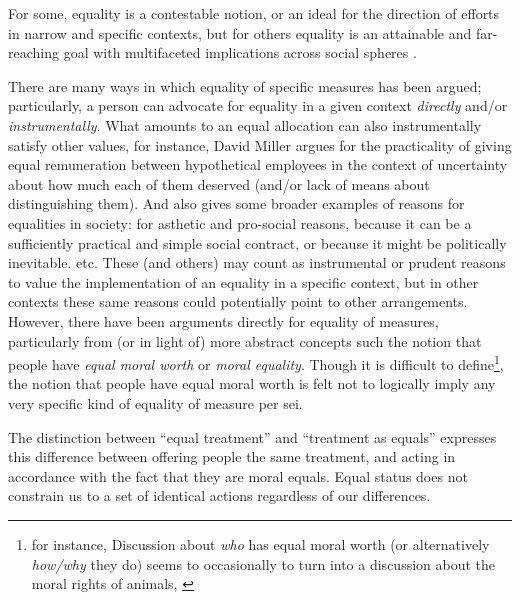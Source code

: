 For some, equality is a contestable notion, or an ideal for the direction of efforts in narrow and specific contexts, but for others equality is an attainable and far-reaching goal with multifaceted implications across social spheres \cite{walzer2008spheres,millerandwalzer,baker1992arguing}.

There are many ways in which equality of specific measures has been argued; particularly, a person can advocate for equality in a given context \textit{directly} and/or \textit{instrumentally}.
What amounts to an equal allocation can also instrumentally satisfy other values, for instance, David Miller \cite{equalityandjustice:1998} argues for the practicality of giving equal remuneration between hypothetical employees in the context of uncertainty about how much each of them deserved (and/or lack of means about distinguishing them). And also gives some broader examples of reasons for equalities in society: for asthetic and pro-social reasons, because it can be a sufficiently practical and simple social contract, or because it might be politically inevitable. etc.
These (and others) may count as instrumental or prudent reasons to value the implementation of an equality in a specific context, but in other contexts these same reasons could potentially point to other arrangements.
However, there have been arguments directly for equality of measures, particularly from (or in light of) more abstract concepts such the notion that people have \textit{equal moral worth} \cite{doallpersonshaveequalmoralworth} or \textit{moral equality}. Though it is difficult to define\footnote{for instance, Discussion about \textit{who} has equal moral worth (or alternatively \textit{how/why} they do) seems to occasionally to turn into a discussion about the moral rights of animals, \cite{doallpersonshaveequalmoralworth}}, the notion that people have equal moral worth is felt not to logically imply any very specific kind of equality of measure per sei.

\begin{displayquote}
The distinction between ``equal treatment'' and ``treatment as equals'' expresses this difference between offering people the same treatment, and acting in accordance with the fact that they are moral equals. Equal status does not constrain us to a set of identical actions regardless of our differences.\cite{whatisbasicequalitynathan}
\end{displayquote}

